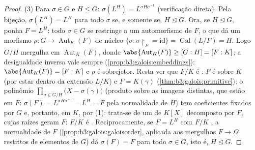 \begin{proof}
(3) Para $\sigma \in G$ e $H \leq G$: $\sigma(L^H) =
L^{\sigma H\sigma^{-1}}$ (verificação direta). Pela bijeção, $\sigma(L^H) = L^H$
para todo $\sigma$ se, e somente se, $H \trianglelefteq G$. Ora, se $H \trianglelefteq G$, ponha
$F = L^H$: todo $\sigma \in
G$ se restringe a um automorfismo de $F$, o que dá um
morfismo $\rho
\colon G \to \operatorname{Aut}_K(F)$ de núcleo $\{\sigma :
\sigma\restriction_F = \mathrm{id}\} = \operatorname{Gal}(L/F) =
H$. Logo $G/H$ mergulha em $\operatorname{Aut}_K(F)$,
donde $\abs{\operatorname{Aut}_K(F)} \geq [G:H] = [F:K]$; a desigualdade inversa vale sempre (\cref{prop:b3:galois:embeddings}):
$\abs{\operatorname{Aut}_K(F)} = [F:K]$ e $\rho$ é sobrejetor. Resta ver que $F/K$ é :
$F$ é  sobre $K$ (por estar dentro da extensão
 $L/K$) e $F = K(\gamma)$ (\cref{thm:b3:galois:primitive}); o polinômio $\prod_{\sigma \in G/H}\bigl(X - \sigma(\gamma)\bigr)$
(produto sobre as imagens distintas, que estão em $F$: $\sigma(F) =
L^{\sigma H\sigma^{-1}} = L^H = F$ pela
normalidade de $H$) tem coeficientes fixados por $G$ e,
portanto, em $K$, por (1): trata-se de um  de
$K[X]$ decomposto por $F$, cujas raízes geram $F$: $F/K$
é . Reciprocamente, se $F = L^H$ com $F/K$ , a
normalidade de $F$ (\cref{prop:b3:galois:galoisorder}, aplicada aos mergulhos $F \to \Omega$
restritos de elementos de $G$) dá $\sigma(F) = F$ para todo $\sigma \in G$, isto é,
$H
\trianglelefteq G$.
\end{proof}

